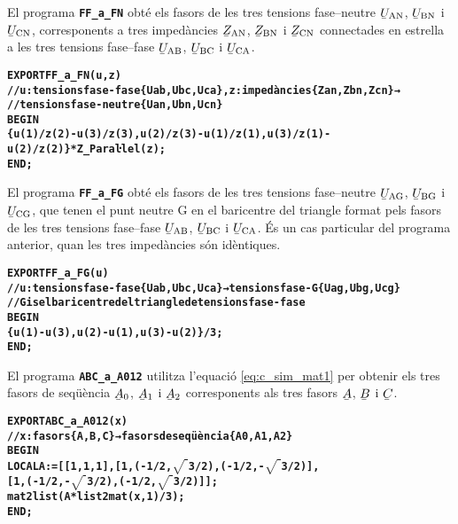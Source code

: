 El programa \texttt{\textbf{FF\_a\_FN}} obté els fasors de les tres tensions fase--neutre $\cmplx{U}\ped{AN}$, $\cmplx{U}\ped{BN}$ i $\cmplx{U}\ped{CN}$, corresponents a tres impedàncies $\cmplx{Z}\ped{AN}$, $\cmplx{Z}\ped{BN}$ i $\cmplx{Z}\ped{CN}$ connectades en estrella a  les tres tensions fase--fase
$\cmplx{U}\ped{AB}$, $\cmplx{U}\ped{BC}$ i $\cmplx{U}\ped{CA}$.
\vspace{-6mm}
\begin{alltt}
\bfseries
{}
    EXPORT FF_a_FN(u,z)
    // u:tensions fase-fase \{Uab,Ubc,Uca\}, z:impedàncies \{Zan,Zbn,Zcn\} →
    // tensions fase-neutre \{Uan,Ubn,Ucn\}
    BEGIN
      \{u(1)/z(2)-u(3)/z(3),u(2)/z(3)-u(1)/z(1),u(3)/z(1)-u(2)/z(2)\}*Z_Paraŀlel(z);
    END;
\end{alltt}

El programa \texttt{\textbf{FF\_a\_FG}} obté els fasors de les tres tensions fase--neutre $\cmplx{U}\ped{AG}$, $\cmplx{U}\ped{BG}$ i $\cmplx{U}\ped{CG}$, que tenen el punt neutre G en el baricentre del triangle format pels fasors de  les tres tensions fase--fase
$\cmplx{U}\ped{AB}$, $\cmplx{U}\ped{BC}$ i $\cmplx{U}\ped{CA}$. És un cas particular del programa anterior, quan les tres impedàncies són idèntiques.
\vspace{-6mm}
\begin{alltt}
\bfseries
{}
    EXPORT FF_a_FG(u)
    // u:tensions fase-fase \{Uab,Ubc,Uca\} → tensions fase-G \{Uag,Ubg,Ucg\}
    // G is el baricentre del triangle de tensions fase-fase
    BEGIN
      \{u(1)-u(3),u(2)-u(1),u(3)-u(2)\}/3;
    END;
\end{alltt}

El programa \texttt{\textbf{ABC\_a\_A012}} utilitza l'equació \eqref{eq:c_sim_mat1} per obtenir els tres fasors de seqüència
$\cmplx{A}_0$, $\cmplx{A}_1$ i  $\cmplx{A}_2$ corresponents als tres fasors $\cmplx{A}$, $\cmplx{B}$ i $\cmplx{C}$.
\vspace{-6mm}
\begin{alltt}
\bfseries
{}
    EXPORT ABC_a_A012(x)
    // x:fasors \{A,B,C\} → fasors de seqüència \{A0,A1,A2\}
    BEGIN
      LOCAL A:=[[1,1,1],[1,(-1/2,\(\sqrt{\phantom{|}}\)3/2),(-1/2,-\(\sqrt{\phantom{|}}\)3/2)],
                [1,(-1/2,-\(\sqrt{\phantom{|}}\)3/2),(-1/2,\(\sqrt{\phantom{|}}\)3/2)]];
      mat2list(A*list2mat(x,1)/3);
    END;
\end{alltt}

